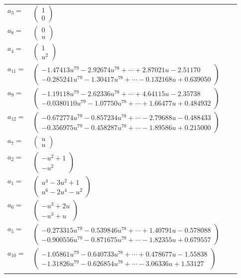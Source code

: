 \documentclass[1p]{elsarticle_modified}
\theoremstyle{definition}
\begin{document}
\begin{tabular}{m{7pt} m{180pt} m{7pt} m{180pt} }
\flushright $a_{3}=$&$\begin{pmatrix}1\\0\end{pmatrix}$ \\
\flushright $a_{8}=$&$\begin{pmatrix}0\\u\end{pmatrix}$ \\
\flushright $a_{4}=$&$\begin{pmatrix}1\\u^2\end{pmatrix}$ \\
\flushright $a_{11}=$&$\begin{pmatrix}-1.47413 u^{79}-2.92674 u^{78}+\cdots+2.87021 u-2.51170\\-0.285241 u^{79}-1.30417 u^{78}+\cdots-0.132168 u+0.639050\end{pmatrix}$ \\
\flushright $a_{9}=$&$\begin{pmatrix}-1.19118 u^{79}-2.62336 u^{78}+\cdots+4.64115 u-2.35738\\-0.0380110 u^{79}-1.07750 u^{78}+\cdots+1.66477 u+0.484932\end{pmatrix}$ \\
\flushright $a_{12}=$&$\begin{pmatrix}-0.672774 u^{79}-0.857234 u^{78}+\cdots-2.79688 u-0.488433\\-0.356975 u^{79}-0.458287 u^{78}+\cdots-1.89586 u+0.215000\end{pmatrix}$ \\
\flushright $a_{7}=$&$\begin{pmatrix}u\\u\end{pmatrix}$ \\
\flushright $a_{2}=$&$\begin{pmatrix}- u^2+1\\- u^2\end{pmatrix}$ \\
\flushright $a_{1}=$&$\begin{pmatrix}u^4-3 u^2+1\\u^6-2 u^4- u^2\end{pmatrix}$ \\
\flushright $a_{6}=$&$\begin{pmatrix}- u^3+2 u\\- u^3+u\end{pmatrix}$ \\
\flushright $a_{5}=$&$\begin{pmatrix}-0.273315 u^{79}-0.539846 u^{78}+\cdots+1.40791 u-0.578088\\-0.900556 u^{79}-0.871675 u^{78}+\cdots-1.82355 u+0.679557\end{pmatrix}$ \\
\flushright $a_{10}=$&$\begin{pmatrix}-1.05861 u^{79}-0.640733 u^{78}+\cdots+0.478677 u-1.55838\\-1.31826 u^{79}-0.626854 u^{78}+\cdots-3.06336 u+1.53127\end{pmatrix}$\\&\end{tabular}
\end{document}
